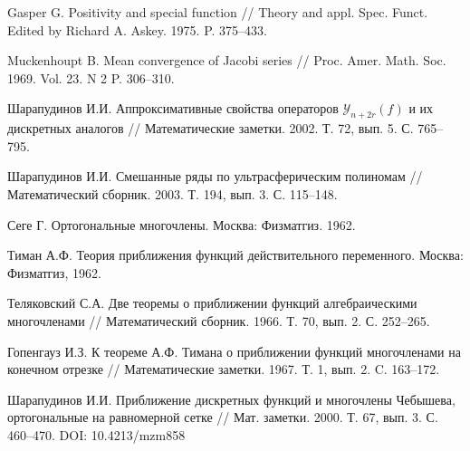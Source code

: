 \begin{thebibliography}{999}

 Gasper G. Positivity and special function // Theory and appl. Spec. Funct. Edited by Richard A. Askey. 1975. P. 375--433.




 Muckenhoupt B. Mean convergence of Jacobi series // Proc. Amer. Math. Soc. 1969. Vol. 23. N 2 P. 306--310.






 Шарапудинов И.И. Аппроксимативные свойства операторов $\mathcal{Y}_{n+2r}(f)$ и их дискретных аналогов // Математические заметки. 2002. Т. 72, вып. 5. С. 765--795.




 Шарапудинов И.И. Смешанные ряды по ультрасферическим полиномам // Математический сборник. 2003. Т. 194, вып. 3. С. 115--148.







 Сеге Г. Ортогональные многочлены. Москва: Физматгиз. 1962.




 Тиман А.Ф. Теория приближения функций действительного переменного. Москва: Физматгиз, 1962.




Теляковский С.А. Две теоремы о приближении функций
алгебраическими многочленами // Математический сборник. 1966. Т. 70, вып. 2. С. 252--265.




 Гопенгауз И.З. К теореме А.Ф. Тимана о приближении
функций многочленами на конечном отрезке // Математические заметки. 1967. Т. 1, вып. 2. C. 163--172.




 Шарапудинов И.И. Приближение дискретных функций и многочлены Чебышева, ортогональные на равномерной сетке // Мат. заметки. 2000. Т. 67, вып. 3. С. 460--470. DOI: 10.4213/mzm858




\end{thebibliography}
